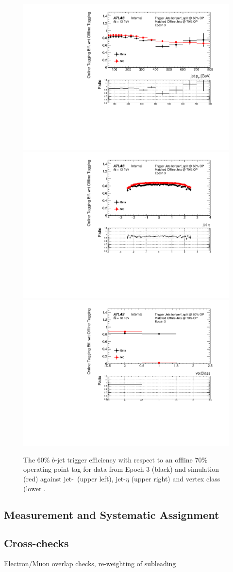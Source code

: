 \begin{figure}[!ht]
\begin{center}
  \includegraphics[width=0.45\linewidth, angle=0]{figs/Trigger/btrigger_old/Epoch3_trigReq_eff_jetPt.pdf}
  \includegraphics[width=0.45\linewidth, angle=0]{figs/Trigger/btrigger_old/Epoch3_trigReq_eff_jetEta.pdf} \\
  \includegraphics[width=0.45\linewidth, angle=0]{figs/Trigger/btrigger_old/Epoch3_trigReq_eff_vtxClass.pdf}
\end{center}
\caption{The 60\% $b$-jet trigger efficiency with respect to an offline 70\% operating point tag
  for data from Epoch 3 (black) and simulation (red) against jet-\pT~(upper left), jet-$\eta$ (upper right)%
  and vertex class (lower%
  .}

\label{fig:Epoch3_eff}
\end{figure}

\FloatBarrier





\subsection{Measurement and Systematic Assignment}

\subsection{Cross-checks}
 Electron/Muon overlap checks, re-weighting of subleading
